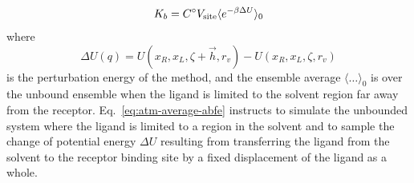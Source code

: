 \documentclass[9pt,bestpractices]{livecoms}
\begin{document}
\begin{equation}\label{eq:atm-average-abfe}
K_b = C^\circ V_{\rm site} \langle e^{-\beta \Delta U} \rangle_0
\end{equation}
where
\begin{equation}\label{eq:atm-deltaU-def}
\Delta U(q) = U(x_R, x_L, \zeta + \vec{h}, r_v) - U(x_R, x_L, \zeta, r_v)
\end{equation}
is the perturbation energy of the method, and the ensemble average $\langle \ldots \rangle_0$ is over the unbound ensemble when the ligand is limited to the solvent region far away from the receptor. Eq.~\ref{eq:atm-average-abfe} instructs to simulate the unbounded system where the ligand is limited to a region in the solvent and to sample the change of potential energy $\Delta U$ resulting from transferring the ligand from the solvent to the receptor binding site by a fixed displacement of the ligand as a whole.
\end{document}
